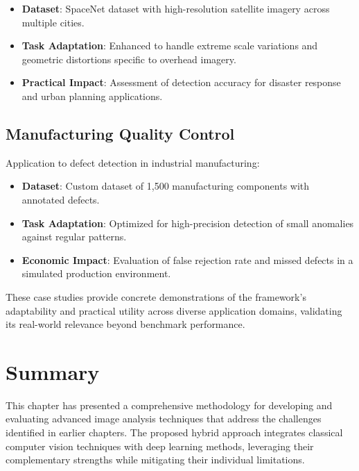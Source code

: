 \begin{itemize}
    \item \textbf{Dataset}: SpaceNet dataset with high-resolution satellite imagery across multiple cities.
    
    \item \textbf{Task Adaptation}: Enhanced to handle extreme scale variations and geometric distortions specific to overhead imagery.
    
    \item \textbf{Practical Impact}: Assessment of detection accuracy for disaster response and urban planning applications.
\end{itemize}

\subsection{Manufacturing Quality Control}
Application to defect detection in industrial manufacturing:

\begin{itemize}
    \item \textbf{Dataset}: Custom dataset of 1,500 manufacturing components with annotated defects.
    
    \item \textbf{Task Adaptation}: Optimized for high-precision detection of small anomalies against regular patterns.
    
    \item \textbf{Economic Impact}: Evaluation of false rejection rate and missed defects in a simulated production environment.
\end{itemize}

These case studies provide concrete demonstrations of the framework's adaptability and practical utility across diverse application domains, validating its real-world relevance beyond benchmark performance.

\section{Summary}

This chapter has presented a comprehensive methodology for developing and evaluating advanced image analysis techniques that address the challenges identified in earlier chapters. The proposed hybrid approach integrates classical computer vision techniques with deep learning methods, leveraging their complementary strengths while mitigating their individual limitations.

